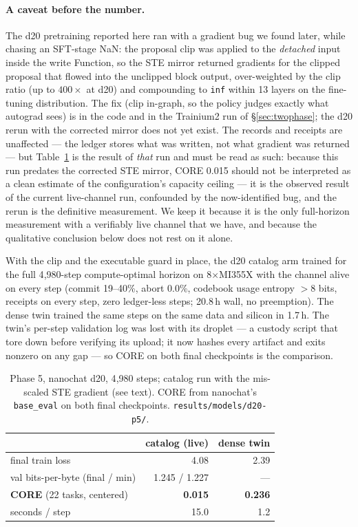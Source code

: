 \documentclass[10pt,twocolumn]{article}
\begin{document}
\paragraph{A caveat before the number.} The d20 pretraining reported here ran
with a gradient bug we found later, while chasing an SFT-stage NaN: the
proposal clip was applied to the \emph{detached} input inside the write
Function, so the STE mirror returned gradients for the clipped proposal that
flowed into the unclipped block output, over-weighted by the clip ratio (up
to $400\times$ at d20) and compounding to \texttt{inf} within 13 layers on
the fine-tuning distribution. The fix (clip in-graph, so the policy judges
exactly what autograd sees) is in the code and in the Trainium2 run of
\S\ref{sec:twophase}; the d20 rerun with the corrected mirror does not yet
exist. The records and receipts are unaffected --- the ledger stores what was
written, not what gradient was returned --- but Table~\ref{tab:price} is the
result of \emph{that} run and must be read as such: because this run
predates the corrected STE mirror, CORE 0.015 should not be interpreted as a
clean estimate of the configuration's capacity ceiling --- it is the observed
result of the current live-channel run, confounded by the now-identified
bug, and the rerun is the definitive measurement. We keep it because it is
the only full-horizon measurement with a verifiably live channel that we
have, and because the qualitative conclusion below does not rest on it alone.

With the clip and the executable guard in place, the d20 catalog arm trained
for the full 4{,}980-step compute-optimal horizon on 8$\times$MI355X with
the channel alive on every step (commit 19--40\%, abort 0.0\%, codebook
usage entropy $>8$ bits, receipts on every step, zero ledger-less steps;
20.8\,h wall, no preemption). The dense twin trained the same steps on the
same data and silicon in 1.7\,h. The twin's per-step validation log was
lost with its droplet --- a custody script that tore down before verifying
its upload; it now hashes every artifact and exits nonzero on any gap --- so
CORE on both final checkpoints is the comparison.

\begin{table}[h]
\footnotesize\centering
\begin{tabular}{@{}lrr@{}}
\toprule
 & catalog (live) & dense twin \\
\midrule
final train loss & 4.08 & 2.39 \\
val bits-per-byte (final / min) & 1.245 / 1.227 & --- \\
\textbf{CORE} (22 tasks, centered) & \textbf{0.015} & \textbf{0.236} \\
seconds / step & 15.0 & 1.2 \\
\bottomrule
\end{tabular}
\caption{Phase 5, nanochat d20, 4{,}980 steps; catalog run with the
mis-scaled STE gradient (see text). CORE from nanochat's \texttt{base\_eval}
on both final checkpoints. \texttt{results/models/d20-p5/}.}
\label{tab:price}
\end{table}
\end{document}

